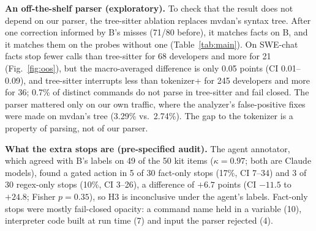 \documentclass[conference]{IEEEtran}
\begin{document}
\textbf{An off-the-shelf parser (exploratory).} To check that the result does not depend on our parser, the tree-sitter ablation replaces mvdan's syntax tree. After one correction informed by B's misses (71/80 before), it matches facts on B, and it matches them on the probes without one (Table~\ref{tab:main}). On SWE-chat facts stop fewer calls than tree-sitter for 68 developers and more for 21 (Fig.~\ref{fig:oos}), but the macro-averaged difference is only 0.05 points (CI 0.01--0.09), and tree-sitter interrupts less than tokenizer+ for 245 developers and more for 36; 0.7\% of distinct commands do not parse in tree-sitter and fail closed. The parser mattered only on our own traffic, where the analyzer's false-positive fixes were made on mvdan's tree (3.29\% vs.\ 2.74\%). The gap to the tokenizer is a property of parsing, not of our parser.

\textbf{What the extra stops are (pre-specified audit).} The agent annotator, which agreed with B's labels on 49 of the 50 kit items ($\kappa=0.97$; both are Claude models), found a gated action in 5 of 30 fact-only stops (17\%, CI 7--34) and 3 of 30 regex-only stops (10\%, CI 3--26), a difference of $+6.7$ points (CI $-11.5$ to $+24.8$; Fisher $p=0.35$), so H3 is inconclusive under the agent's labels. Fact-only stops were mostly fail-closed opacity: a command name held in a variable (10), interpreter code built at run time (7) and input the parser rejected (4).
\end{document}
